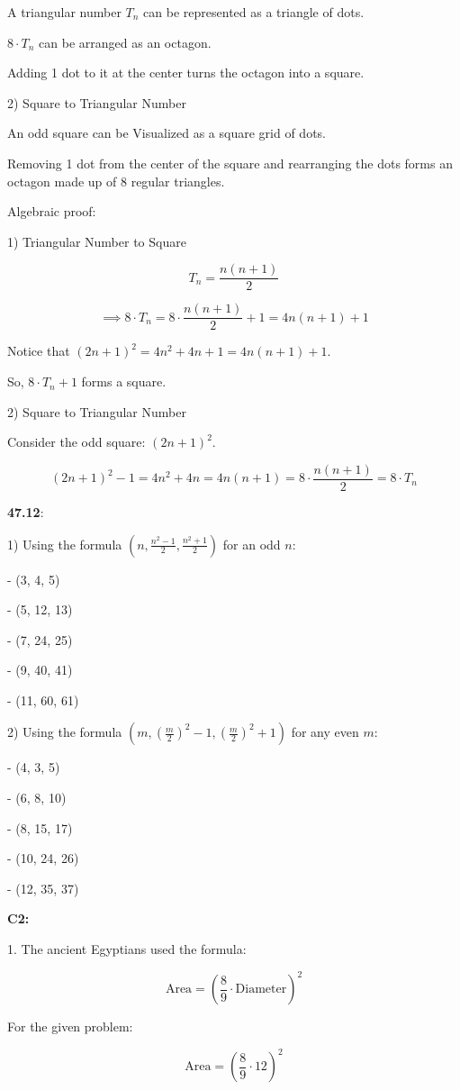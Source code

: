 \documentclass{article}
\begin{document}
A triangular number $T_n$ can be represented as a triangle of dots.

$8 \cdot T_n$ can be arranged as an octagon.

Adding 1 dot to it at the center turns the octagon into a square.

2) Square to Triangular Number

An odd square can be Visualized as a square grid of dots.

Removing 1 dot from the center of the square and rearranging the dots
forms an octagon made up of 8 regular triangles.

Algebraic proof:

1) Triangular Number to Square

\[T_n = \frac{n(n+1)}{2}\]

\[\implies 8 \cdot T_n = 8 \cdot \frac{n(n+1)}{2} + 1 = 4n(n+1) + 1\]

Notice that $(2n+1)^2 = 4n^2 + 4n + 1 = 4n(n+1) + 1$.

So, $8 \cdot T_n + 1$ forms a square.

2) Square to Triangular Number

Consider the odd square: $(2n + 1)^2$.

\[(2n + 1)^2 - 1 = 4n^2 + 4n = 4n(n + 1) = 8 \cdot \frac{n(n+1)}{2} = 8 \cdot T_n\]


\textbf{47.12}:

1) Using the formula $(n, \frac{n^2 - 1}{2}, \frac{n^2 + 1}{2})$ for an odd $n$:

- (3, 4, 5)

- (5, 12, 13)

- (7, 24, 25)

- (9, 40, 41)

- (11, 60, 61)

2) Using the formula $(m, \left(\frac{m}{2}\right)^2 - 1,
\left(\frac{m}{2}\right)^2 + 1)$ for any even $m$:

- (4, 3, 5)

- (6, 8, 10)

- (8, 15, 17)

- (10, 24, 26)

- (12, 35, 37)


\textbf{C2:}

1. The ancient Egyptians used the formula:

\[\text{Area} = \left(\frac{8}{9} \cdot \text{Diameter}\right)^2\]

For the given problem:

\[\text{Area} = \left(\frac{8}{9} \cdot 12\right)^2\]
\end{document}
